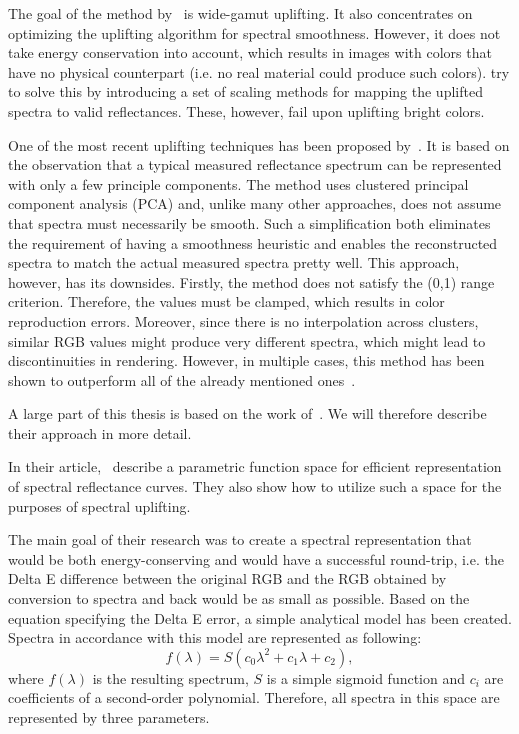The goal of the method by~\citet{upsamplingMeng} is wide-gamut uplifting. It also concentrates on optimizing the uplifting algorithm for spectral smoothness. However, it does not take energy conservation into account, which results in images with colors that have no physical counterpart (i.e. no real material could produce such colors). \citet{upsamplingMeng} try to solve this by introducing a set of scaling methods for mapping the uplifted spectra to valid reflectances. These, however, fail upon uplifting bright colors. 

One of the most recent uplifting techniques has been proposed by~\citet{upsamplingOtsu}. It is based on the observation that a typical measured reflectance spectrum can be represented with only a few principle components. The method uses clustered principal component analysis (PCA) and, unlike many other approaches, does not assume that spectra must necessarily be smooth. Such a simplification both eliminates the requirement of having a smoothness heuristic and enables the reconstructed spectra to match the actual measured spectra pretty well. This approach, however, has its downsides. Firstly, the method does not satisfy the (0,1) range criterion. Therefore, the values must be clamped, which results in color reproduction errors. Moreover, since there is no interpolation across clusters, similar RGB values might produce very different spectra, which might lead to discontinuities in rendering. However, in multiple cases, this method has been shown to outperform all of the already mentioned ones~\cite{upsamplingJakobHanika}.

A large part of this thesis is based on the work of~\citet{upsamplingJakobHanika}. We will therefore describe their approach in more detail.

In their article,~\citet{upsamplingJakobHanika} describe a parametric function space for efficient representation of spectral reflectance curves. They also show how to utilize such a space for the purposes of spectral uplifting.

The main goal of their research was to create a spectral representation that would be both energy-conserving and would have a successful round-trip, i.e. the Delta E difference between the original RGB and the RGB obtained by conversion to spectra and back would be as small as possible. Based on the equation specifying the Delta E error, a simple analytical model has been created. Spectra in accordance with this model are represented as following:
\begin{equation} \label{sigmoidRepresentation}
f(\lambda)=S(c_{0}\lambda^2+c_{1}\lambda+c_{2}),
\end{equation}
where $f(\lambda)$ is the resulting spectrum, $S$ is a simple sigmoid function and $c_{i}$ are coefficients of a second-order polynomial. Therefore, all spectra in this space are represented by three parameters.

